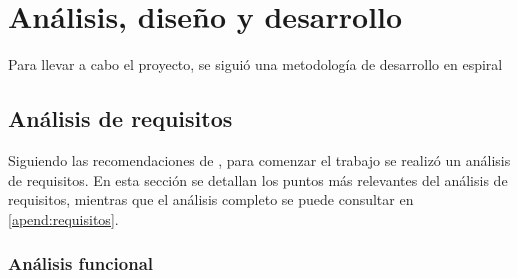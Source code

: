 \chapter{Análisis, diseño y desarrollo\label{sec:disenhoYDesarrollo}}


Para llevar a cabo el proyecto, se siguió una metodología de desarrollo en espiral


\section{Análisis de requisitos}

Siguiendo las recomendaciones de \cite{ISO12207}, para comenzar el trabajo se realizó un análisis de requisitos. En esta sección se detallan los puntos más relevantes del análisis de requisitos, mientras que el análisis completo se puede consultar en \ref{apend:requisitos}.

\subsection{Análisis funcional}

